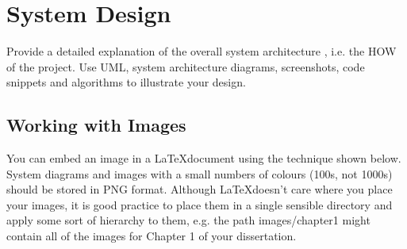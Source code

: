 \chapter{System Design}
Provide a detailed explanation of the overall system architecture \cite{lin1991divergence}, i.e. the HOW of the project.
Use UML, system architecture diagrams, screenshots, code snippets and algorithms to illustrate your design.

\section{Working with Images}
You can embed an image in a \LaTeX document using the technique shown below. System diagrams and images with a small numbers of colours (100s, not 1000s) should be stored in PNG format. Although \LaTeX doesn't care where you place your images, it is good practice to place them in a single sensible directory and apply some sort of hierarchy to them, e.g. the path images/chapter1 might contain all of the images for Chapter 1 of your dissertation.
